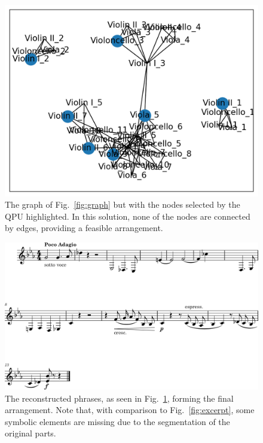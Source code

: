 \documentclass[aps,pra,10pt,twocolumn]{revtex4-2}
\begin{document}
\begin{figure}[h]
    \centering
    \includegraphics[width=\linewidth]{../Trials/1_solution.png}
    \caption{The graph of Fig.\ \ref{fig:graph} but with the nodes selected by the QPU highlighted. In this solution, none of the nodes are connected by edges, providing a feasible arrangement.}
    \label{fig:solution}
\end{figure}

\begin{figure}[h]
    \centering
    \includegraphics[width=\linewidth]{../Trials/1_arrangement.png}
    \caption{The reconstructed phrases, as seen in Fig.\ \ref{fig:solution}, forming the final arrangement. Note that, with comparison to Fig.\ \ref{fig:excerpt}, some symbolic elements are missing due to the segmentation of the original parts.}
    \label{fig:arrangement}
\end{figure}
\end{document}
